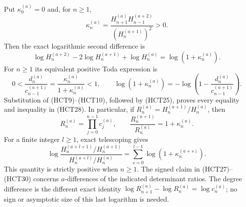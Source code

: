 \documentclass[11pt,a4paper]{article}
\begin{document}
Put $\kappa_0^{(a)}=0$ and, for $n\geq1$,
\begin{equation}\tag{HCT26}
 \kappa_n^{(a)}=
 \frac{H_{n+1}^{(a)}H_{n-1}^{(a+2)}}{(H_n^{(a+1)})^2}>0.
\end{equation}
Then the exact logarithmic second difference is
\begin{equation}\tag{HCT27}
 \log H_n^{(a+2)}-2\log H_n^{(a+1)}+\log H_n^{(a)}
 =\log(1+\kappa_n^{(a)}).
\end{equation}
For $n\geq1$ its equivalent positive Toda expression is
\begin{equation}\tag{HCT28}
 0<\frac{d_n^{(a)}}{c_{n-1}^{(a+1)}}
 =\frac{\kappa_n^{(a)}}{1+\kappa_n^{(a)}}<1,\qquad
 \log(1+\kappa_n^{(a)})
 =-\log\left(1-\frac{d_n^{(a)}}{c_{n-1}^{(a+1)}}\right).
\end{equation}
Substitution of (HCT9)--(HCT10), followed by (HCT25), proves
every equality and inequality in (HCT28).
In particular, if $R_n^{(a)}=H_n^{(a+1)}/H_n^{(a)}$, then
\begin{equation}\tag{HCT29}
 R_n^{(a)}=\prod_{j=0}^{n-1}c_j^{(a)},\qquad
 \frac{R_n^{(a+1)}}{R_n^{(a)}}=1+\kappa_n^{(a)}.
\end{equation}
For a finite integer $l\geq1$, exact telescoping gives
\begin{equation}\tag{HCT30}
 \log\frac{H_n^{(a+l+1)}/H_n^{(a+1)}}
 {H_n^{(a+l)}/H_n^{(a)}}
 =\sum_{s=0}^{l-1}\log(1+\kappa_n^{(a+s)}).
\end{equation}
This quantity is strictly positive when $n\geq1$.
The signed claim in (HCT27)--(HCT30) concerns $a$-differences
of the indicated determinant ratios. The degree difference is
the different exact identity
$\log R_{n+1}^{(a)}-\log R_n^{(a)}=\log c_n^{(a)}$;
no sign or asymptotic size of this last logarithm is needed.
\end{document}
